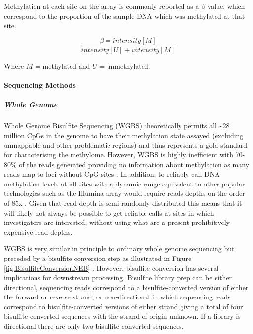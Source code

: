 \documentclass[]{book}
\let\oldparagraph\paragraph
\renewcommand{\paragraph}[1]{\oldparagraph{#1}\mbox{}}
\let\oldsubparagraph\subparagraph
\renewcommand{\subparagraph}[1]{\oldsubparagraph{#1}\mbox{}}
\begin{document}
Methylation at each site on the array is commonly reported as a \(\beta\) value, which correspond to the proportion of the sample DNA which was methylated at that site.

\[\frac{\beta=intensity[M]}{intensity[U] + intensity[M]}\]

Where \(M\) = methylated and \(U\) = unmethylated.

\hypertarget{sequencing-methods}{%
\paragraph{Sequencing Methods}\label{sequencing-methods}}

\hypertarget{whole-genome}{%
\subparagraph{Whole Genome}\label{whole-genome}}

Whole Genome Bisulfite Sequencing (WGBS) theoretically permits all \textasciitilde28 million CpGs in the genome to have their methylation state assayed (excluding unmappable and other problematic regions) and thus represents a gold standard for characterising the methylome. However, WGBS is highly inefficient with 70-80\% of the reads generated providing no information about methylation as many reads map to loci without CpG sites \citep{Ziller2013}. In addition, to reliably call DNA methylation levels at all sites with a dynamic range equivalent to other popular technologies such as the Illumina array would require reads depths on the order of 85x \citep{Libertini2016}. Given that read depth is semi-randomly distributed this means that it will likely not always be possible to get reliable calls at sites in which investigators are interested, without using what are a present prohibitively expensive read depths.

WGBS is very similar in principle to ordinary whole genome sequencing but preceded by a bisulfite conversion step as illustrated in Figure \ref{fig:BisulfiteConversionNEB} \citep{Bock2010}. However, bisulfite conversion has several implications for downstream processing. Bisulfite library prep can be either directional, sequencing reads correspond to a bisulfite-converted version of either the forward or reverse strand, or non-directional in which sequencing reads correspond to bisulfite-converted versions of either strand giving a total of four bisulfite converted sequences with the strand of origin unknown. If a library is directional there are only two bisulfite converted sequences.
\end{document}
